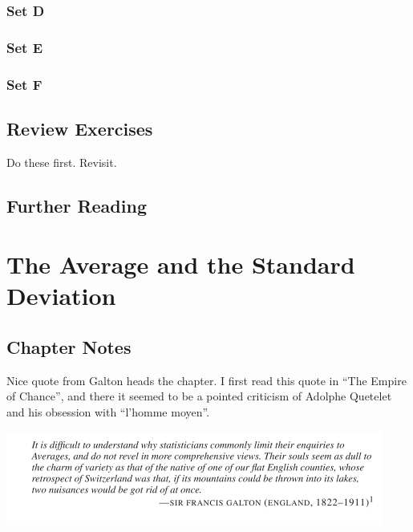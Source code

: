 \documentclass[
]{book}
\begin{document}
\hypertarget{set-d}{%
\subsection*{Set D}\label{set-d}}

\hypertarget{set-e}{%
\subsection*{Set E}\label{set-e}}

\hypertarget{set-f}{%
\subsection*{Set F}\label{set-f}}

\hypertarget{review-exercises-1}{%
\section{Review Exercises}\label{review-exercises-1}}

Do these first. Revisit.

\hypertarget{further-reading-2}{%
\section*{Further Reading}\label{further-reading-2}}

\hypertarget{average}{%
\chapter{The Average and the Standard Deviation}\label{average}}

\hypertarget{chapter-notes-3}{%
\section{Chapter Notes}\label{chapter-notes-3}}

Nice quote from Galton heads the chapter. I first read this quote in ``The Empire of Chance'', and there it seemed to be a pointed criticism of Adolphe Quetelet and his obsession with ``l'homme moyen''.

\includegraphics{images/Ch04Img01.png}
\end{document}

